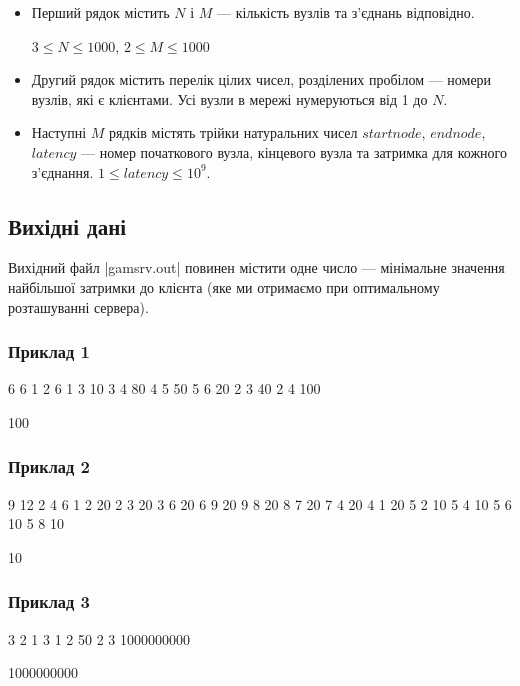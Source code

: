 \documentclass[12pt,a4paper]{article}
\begin{document}
\begin{itemize}
    \item Перший рядок містить \(N\) і \(M\) --- кількість вузлів та з’єднань відповідно.

    \(3 \leq N \leq 1000\), \(2 \leq M \leq 1000\)
    \item Другий рядок містить перелік цілих чисел, розділених пробілом --- номери вузлів, які є клієнтами. Усі вузли в мережі нумеруються від 1 до \(N\).
    \item Наступні \(M\) рядків містять трійки натуральних чисел \(startnode\), \(endnode\), \(latency\) --- номер початкового вузла, кінцевого вузла та затримка для кожного з’єднання. \(1 \leq latency \leq 10^9\).
\end{itemize}


\subsection*{Вихідні дані}

Вихідний файл |gamsrv.out| повинен містити одне число --- мінімальне значення найбільшої затримки до клієнта (яке ми отримаємо при оптимальному розташуванні сервера).


\pagebreak


\subsubsection*{Приклад 1}

\textbf{}

\begin{codeblock}
6 6
1 2 6
1 3 10
3 4 80
4 5 50
5 6 20
2 3 40
2 4 100
\end{codeblock}

\textbf{}

\begin{codeblock}
100
\end{codeblock}


\subsubsection*{Приклад 2}

\textbf{}

\begin{codeblock}
9 12
2 4 6
1 2 20
2 3 20
3 6 20
6 9 20
9 8 20
8 7 20
7 4 20
4 1 20
5 2 10
5 4 10
5 6 10
5 8 10
\end{codeblock}

\textbf{}

\begin{codeblock}
10
\end{codeblock}


\subsubsection*{Приклад 3}

\textbf{}

\begin{codeblock}
3 2
1 3
1 2 50
2 3 1000000000
\end{codeblock}

\textbf{}

\begin{codeblock}
1000000000
\end{codeblock}
\end{document}
